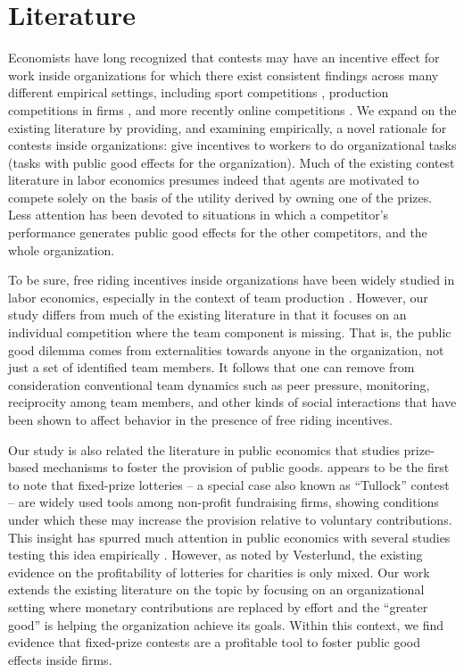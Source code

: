 \documentclass[12pt, titlepage]{article}
\begin{document}
\section{Literature}\label{literature}

Economists have long recognized that contests may have an incentive
effect for work inside organizations
\citep{lazear1981rank, green1983comparison, nalebuff1983prizes, mary1984economic}
for which there exist consistent findings across many different
empirical settings, including sport competitions
\citep{ehrenberg1990tournaments}, production competitions in firms
\citep{knoeber1994testing, terwiesch2008innovation}, and more recently
online competitions
\citep{boudreau2011incentives, boudreau2016performance}. We expand on
the existing literature by providing, and examining empirically, a novel
rationale for contests inside organizations: give incentives to workers
to do organizational tasks (tasks with public good effects for the
organization). Much of the existing contest literature in labor
economics presumes indeed that agents are motivated to compete solely on
the basis of the utility derived by owning one of the prizes. Less
attention has been devoted to situations in which a competitor's
performance generates public good effects for the other competitors, and
the whole organization.

To be sure, free riding incentives inside organizations have been widely
studied in labor economics, especially in the context of team production
\citep{erev1993constructive, hamilton2003team, boning2007opportunity, gibbs2014field}.
However, our study differs from much of the existing literature in that
it focuses on an individual competition where the team component is
missing. That is, the public good dilemma comes from externalities
towards anyone in the organization, not just a set of identified team
members. It follows that one can remove from consideration conventional
team dynamics such as peer pressure, monitoring, reciprocity among team
members, and other kinds of social interactions that have been shown to
affect behavior in the presence of free riding incentives.

Our study is also related the literature in public economics that
studies prize-based mechanisms to foster the provision of public goods.
\citet{morgan2000funding} appears to be the first to note that
fixed-prize lotteries -- a special case also known as ``Tullock''
contest -- are widely used tools among non-profit fundraising firms,
showing conditions under which these may increase the provision relative
to voluntary contributions. This insight has spurred much attention in
public economics with several studies testing this idea empirically
\citep[see][ for a survey]{vesterlund2012voluntary}. However, as noted
by Vesterlund, the existing evidence on the profitability of lotteries
for charities is only mixed. Our work extends the existing literature on
the topic by focusing on an organizational setting where monetary
contributions are replaced by effort and the ``greater good'' is helping
the organization achieve its goals. Within this context, we find
evidence that fixed-prize contests are a profitable tool to foster
public good effects inside firms.
\end{document}
